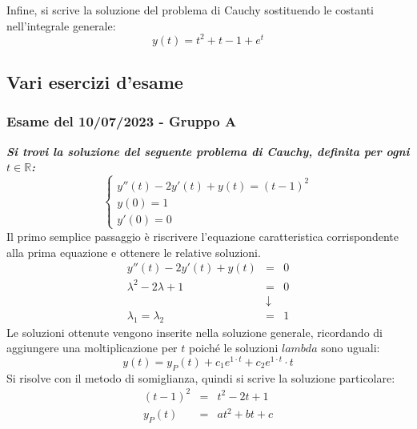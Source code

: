 \documentclass[a4paper]{article}
\begin{document}
	Infine, si scrive la soluzione del problema di Cauchy sostituendo le costanti nell'integrale generale:
	\begin{equation*}
		y\left(t\right) = t^{2} + t -1 + e^{t}
	\end{equation*}\newpage

	\subsection{Vari esercizi d'esame}

	\subsubsection{Esame del 10/07/2023 - Gruppo A}

	\textcolor{Green4}{\textbf{\emph{Si trovi la soluzione del seguente problema di Cauchy, definita per ogni $t \in \mathbb{R}$:}}}
	\begin{equation*}
		\begin{cases}
			y''\left(t\right) - 2y'\left(t\right) + y\left(t\right) = \left(t-1\right)^{2} \\
			y\left(0\right) = 1 \\
			y'\left(0\right) = 0
		\end{cases}
	\end{equation*}
	Il primo semplice passaggio è riscrivere l'equazione caratteristica corrispondente alla prima equazione e ottenere le relative soluzioni.
	\begin{equation*}
		\begin{array}{rcl}
			y''\left(t\right) - 2y'\left(t\right) + y\left(t\right) &=& 0 \\ [.5em]
			\lambda^{2} - 2\lambda + 1 &=& 0 \\
			&\downarrow& \\
			\lambda_{1} = \lambda_{2} &=& 1
		\end{array}
	\end{equation*}
	Le soluzioni ottenute vengono inserite nella soluzione generale, ricordando di aggiungere una moltiplicazione per $t$ poiché le soluzioni $lambda$ sono uguali:
	\begin{equation*}
		y\left(t\right) = y_{P}\left(t\right) + c_{1} e^{1 \cdot t} + c_{2} e^{1 \cdot t} \cdot t
	\end{equation*}
	Si risolve con il metodo di somiglianza, quindi si scrive la soluzione particolare:
	\begin{equation*}
		\begin{array}{rcl}
			\left(t-1\right)^{2} &=& t^{2} -2t + 1 \\
			y_{P}\left(t\right) &=& at^{2} + bt + c
		\end{array}
	\end{equation*}
\end{document}

